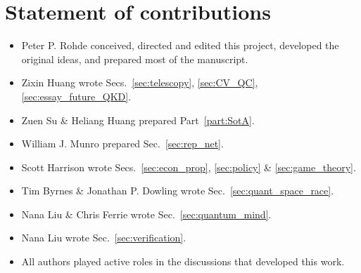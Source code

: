 %
%

\section*{Statement of contributions}

\begin{itemize}
\item Peter P. Rohde conceived, directed and edited this project, developed the original ideas, and prepared most of the manuscript.
\item Zixin Huang wrote Secs.~\ref{sec:telescopy}, \ref{sec:CV_QC}, \ref{sec:essay_future_QKD}.
\item Zuen Su \& Heliang Huang prepared Part~\ref{part:SotA}.
\item William J. Munro prepared Sec.~\ref{sec:rep_net}. 
\item Scott Harrison wrote Secs.~\ref{sec:econ_prop}, \ref{sec:policy} \& \ref{sec:game_theory}.
\item Tim Byrnes \& Jonathan P. Dowling wrote Sec.~\ref{sec:quant_space_race}.
\item Nana Liu \& Chris Ferrie wrote Sec.~\ref{sec:quantum_mind}.
\item Nana Liu wrote Sec.~\ref{sec:verification}.
\item All authors played active roles in the discussions that developed this work. 
\end{itemize}

